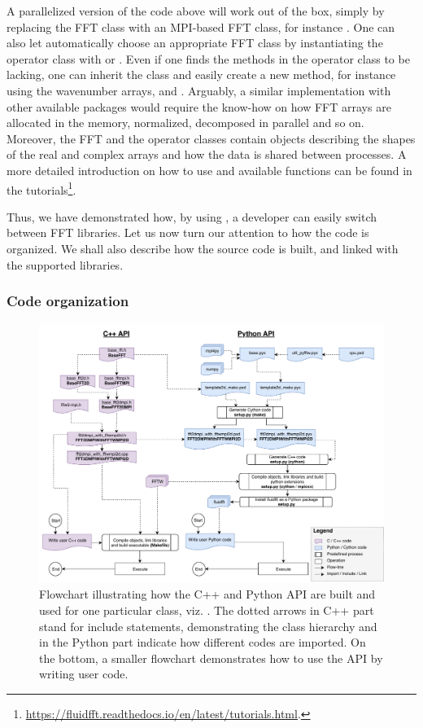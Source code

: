 A parallelized version of the code above will work out of the box, simply by
replacing the FFT class with an MPI-based FFT class, for instance
. One can also let  automatically
choose an appropriate FFT class by instantiating the operator class with
 or . Even if one finds the methods
in the operator class to be lacking, one can inherit the class and easily create a
new method, for instance using the wavenumber arrays,  and
.  Arguably, a similar implementation with other available
packages would require the know-how on how FFT arrays are allocated in the memory,
normalized, decomposed in parallel and so on.
%
Moreover, the FFT and the operator classes contain objects describing the shapes
of the real and complex arrays and how the data is shared between processes.
%
A more detailed introduction on how
to use  and available functions can be found in the
tutorials\footnote{%
\url{https://fluidfft.readthedocs.io/en/latest/tutorials.html}.}.

Thus, we have demonstrated how, by using , a developer can
easily switch between FFT libraries.
%
Let us now turn our attention to how the code is organized. We shall also describe
how the source code is built, and linked with the supported libraries.

\subsubsection{Code organization}
\begin{figure}[htp]
  \centering
  \includegraphics[width=0.96\linewidth]{Pyfig/fig_build_use}
  \caption{Flowchart illustrating how the C++ and Python API are built and used
  for one particular class, viz. . The dotted
  arrows in C++ part stand for include statements, demonstrating the class
  hierarchy and in the Python part indicate how different codes are imported. On
  the bottom, a smaller flowchart demonstrates how to use the API by writing user
  code.  }\label{fig:build_use}
\end{figure}

